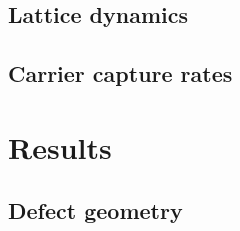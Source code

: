 




\subsection{Lattice dynamics}

\subsection{Carrier capture rates}

\section{Results} \label{ch:6-results}

\subsection{Defect geometry}

